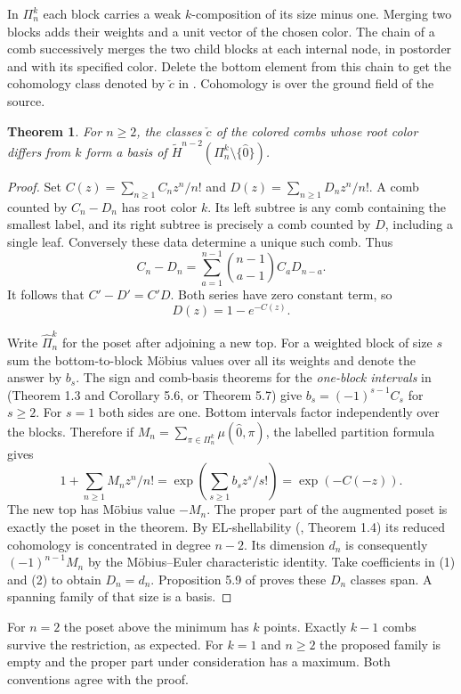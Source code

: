 \documentclass[11pt]{article}
\newtheorem{theorem}{Theorem}
\begin{document}
In $\Pi_n^k$ each block carries a weak $k$-composition of its size minus one.
Merging two blocks adds their weights and a unit vector of the chosen color.
The chain of a comb successively merges the two child blocks at each internal
node, in postorder and with its specified color. Delete the bottom element
from this chain to get the cohomology class denoted by $\check c$ in
\cite{g}. Cohomology is over the ground field of the source.
\begin{theorem}
For $n\ge2$, the classes $\check c$ of the colored combs whose root color
differs from $k$ form a basis of
$\widetilde H^{n-2}(\Pi_n^k\setminus\{\hat0\})$.
\end{theorem}
\begin{proof}
Set $C(z)=\sum_{n\ge1} C_nz^n/n!$ and
$D(z)=\sum_{n\ge1}D_nz^n/n!$. A comb counted by $C_n-D_n$ has root color
$k$. Its left subtree is any comb containing the smallest label, and its
right subtree is precisely a comb counted by $D$, including a single leaf.
Conversely these data determine a unique such comb. Thus
\[
 C_n-D_n=\sum_{a=1}^{n-1}\binom{n-1}{a-1} C_aD_{n-a}.
\]
It follows that $C'-D'=C'D$. Both series have zero constant term, so
\[
                         D(z)=1-e^{-C(z)}.                       \tag{1}
\]

Write $\widehat\Pi_n^k$ for the poset after adjoining a new top.
For a weighted block of size $s$ sum the bottom-to-block M\"obius values over
all its weights and denote the answer by $b_s$. The sign and comb-basis
theorems for the \emph{one-block intervals} in \cite{g} (Theorem 1.3 and
Corollary 5.6, or Theorem 5.7) give $b_s=(-1)^{s-1}C_s$ for $s\ge2$.
For $s=1$ both sides are one. Bottom intervals factor independently over
the blocks. Therefore if $M_n=\sum_{\pi\in\Pi_n^k}\mu(\hat0,\pi)$, the
labelled partition formula gives
\[
       1+\sum_{n\ge1}M_nz^n/n!
          =\exp\left(\sum_{s\ge1}b_s z^s/s!\right)
          =\exp(-C(-z)).                                         \tag{2}
\]
The new top has M\"obius value $-M_n$. The proper part of the augmented
poset is exactly the poset in the theorem. By EL-shellability
(\cite{g}, Theorem 1.4) its reduced cohomology is concentrated in degree
$n-2$. Its dimension $d_n$ is consequently $(-1)^{n-1}M_n$ by the
M\"obius--Euler characteristic identity. Take coefficients in (1) and (2)
to obtain $D_n=d_n$. Proposition 5.9 of \cite{g} proves these $D_n$ classes
span. A spanning family of that size is a basis.
\end{proof}
For $n=2$ the poset above the minimum has $k$ points. Exactly $k-1$ combs
survive the restriction, as expected. For $k=1$ and $n\ge2$ the proposed
family is empty and the proper part under consideration has a maximum.
Both conventions agree with the proof.
\end{document}
